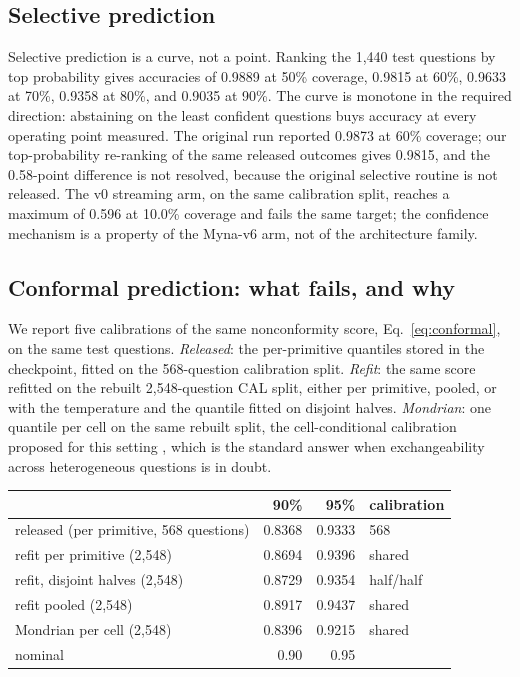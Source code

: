 \documentclass[11pt]{article}
\begin{document}
\subsection{Selective prediction}
Selective prediction is a curve, not a point. Ranking the 1{,}440 test questions by top probability
gives accuracies of 0.9889 at 50\% coverage, 0.9815 at 60\%, 0.9633 at 70\%, 0.9358 at 80\%, and
0.9035 at 90\%. The curve is monotone in the required direction: abstaining on the least confident
questions buys accuracy at every operating point measured. The original run reported 0.9873 at 60\%
coverage; our top-probability re-ranking of the same released outcomes gives 0.9815, and the
0.58-point difference is not resolved, because the original selective routine is not released.
The v0 streaming arm, on the same calibration split, reaches a maximum of 0.596 at 10.0\% coverage
and fails the same target; the confidence mechanism is a property of the Myna-v6{} arm, not of the
architecture family.

\subsection{Conformal prediction: what fails, and why}

We report five calibrations of the same nonconformity score, Eq.~\eqref{eq:conformal}, on the same
test questions. \emph{Released}: the per-primitive quantiles stored in the checkpoint, fitted on the
568-question calibration split. \emph{Refit}: the same score refitted on the rebuilt
2{,}548-question CAL split, either per primitive, pooled, or with the temperature and the quantile
fitted on disjoint halves. \emph{Mondrian}: one quantile per cell on the same rebuilt split, the
cell-conditional calibration proposed for this setting \citep{vovk2012conditional}, which is the standard answer when
exchangeability across heterogeneous questions is in doubt.

\begin{center}
\footnotesize
\begin{tabular}{lrrl}
\toprule
 & 90\% & 95\% & calibration \\
\midrule
released (per primitive, 568 questions) & 0.8368 & 0.9333 & 568 \\
refit per primitive (2{,}548) & 0.8694 & 0.9396 & shared \\
refit, disjoint halves (2{,}548) & 0.8729 & 0.9354 & half/half \\
refit pooled (2{,}548) & 0.8917 & 0.9437 & shared \\
Mondrian per cell (2{,}548) & 0.8396 & 0.9215 & shared \\
\midrule
nominal & 0.90 & 0.95 & \\
\bottomrule
\end{tabular}
\end{center}
\end{document}
